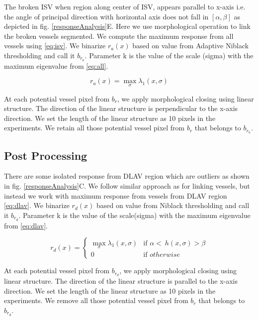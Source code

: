 The broken ISV when region along center of ISV, appears parallel to x-axis i.e. the angle of principal direction with horizontal axis does not fall in $[\alpha, \beta]$ as depicted in fig. \ref{responseAnalysis}E. Here we use morphological operation to link the broken vessels segmented. We compute the maximum response from all vessels using \eqref{eq:isv}. We binarize $r_{a}(x)$ based on value from Adaptive Niblack thresholding and call it $b_{r_a}$. Parameter k is the value of the scale (sigma) with the maximum eigenvalue from \eqref{eq:all}.

\begin{equation}\label{eq:all}
r_{a}(x) = \max_{\sigma} \lambda_{1}(x,\sigma) 
\end{equation}

At each potential vessel pixel from $b_{r}$, we apply morphological closing using linear structure. The direction of the linear structure is perpendicular to the x-axis direction. We set the length of the linear structure as 10 pixels in the experiments. We retain all those potential vessel pixel from $b_{r}$ that belongs to $b_{r_a}$.

\subsection{Post Processing}

There are some isolated response from DLAV region which are outliers as shown in fig. \ref{responseAnalysis}C. We follow similar approach as for linking vessels, but instead we work with maximum response from vessels from DLAV region \eqref{eq:dlav}. We binarize $r_{d}(x)$ based on value from Niblack thresholding and call it $b_{r_d}$. Parameter k is the value of the scale(sigma) with the maximum eigenvalue from \eqref{eq:dlav}.

\begin{equation}\label{eq:dlav}
r_{d}(x) = \begin{cases} \max_{\sigma} \lambda_{1}(x,\sigma) &\mbox{if } \alpha < \ h(x, \sigma) > \beta\\ 
0 & \mbox{if } otherwise \end{cases} 
\end{equation}

At each potential vessel pixel from $b_{r_d}$, we apply morphological closing using linear structure. The direction of the linear structure is parallel to the x-axis direction. We set the length of the linear structure as 10 pixels in the experiments. We remove all those potential vessel pixel from $b_{r}$ that belongs to $b_{r_d}$.


